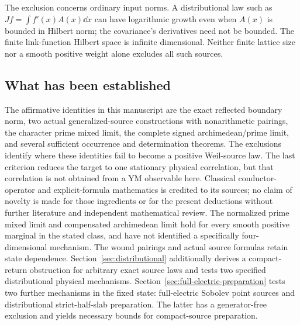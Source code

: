 The exclusion concerns ordinary input norms. A distributional law
such as $Jf=\int f'(x)A(x)\dd x$ can have logarithmic growth even
when $A(x)$ is bounded in Hilbert norm; the covariance's derivatives
need not be bounded. The finite link-function Hilbert space is
infinite dimensional. Neither finite lattice size nor a smooth
positive weight alone excludes all such sources.

\subsection{What has been established}
The affirmative identities in this manuscript are the exact reflected
boundary norm, two actual generalized-source constructions with
nonarithmetic pairings, the character prime mixed limit, the complete
signed archimedean/prime limit, and several sufficient occurrence and
determination theorems. The exclusions identify where these identities
fail to become a positive Weil-source law. The last criterion reduces
the target to one stationary physical correlation, but that correlation
is not obtained from a YM observable here. Classical conductor-operator
and explicit-formula mathematics is credited to its sources; no claim
of novelty is made for those ingredients or for the present deductions
without further literature and independent mathematical review.
The normalized prime mixed limit and compensated archimedean limit
hold for every smooth positive marginal in the stated class, and
have not identified a specifically four-dimensional mechanism.
The wound pairings and actual source formulas retain state dependence.
Section~\ref{sec:distributional} additionally derives a compact-return
obstruction for arbitrary exact source laws and tests two specified
distributional physical mechanisms.
Section~\ref{sec:full-electric-preparation} tests two further mechanisms
in the fixed state: full-electric Sobolev point sources and distributional
strict-half-slab preparation. The latter has a generator-free exclusion
and yields necessary bounds for compact-source preparation.
